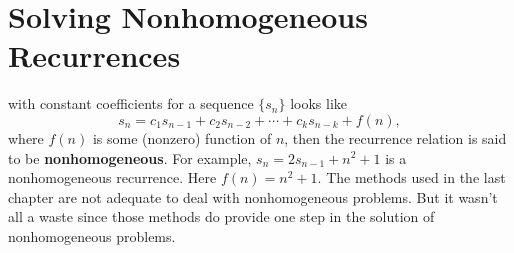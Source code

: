 \chapter{Solving Nonhomogeneous Recurrences}\label{ch:Solving Nonhomogeneous Recurrences}

 with constant coefficients for a
sequence $\{s_n\}$ looks like
$$s_n= c_1s_{n-1}+c_2s_{n-2}+\cdots+c_ks_{n-k} + f(n),$$
where $f(n)$ is some (nonzero) function of $n$, then the recurrence
relation  is said to be {\bfseries nonhomogeneous}. For example, $s_n =
2s_{n-1}+n^2+1$ is a nonhomogeneous recurrence. Here $f(n) = n^2+1.$
The methods used in the last chapter are not adequate to deal with
nonhomogeneous problems. But it wasn't all a waste since those methods
do provide one step in the solution of nonhomogeneous problems.


